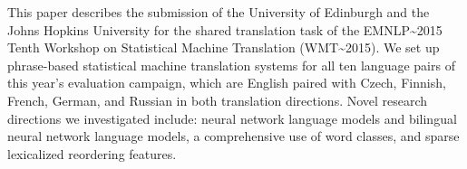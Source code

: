 This paper describes the submission of the University of Edinburgh and the Johns Hopkins University for the shared translation task of the EMNLP{\textasciitilde}2015 Tenth Workshop on Statistical Machine Translation (WMT{\textasciitilde}2015). We set up phrase-based statistical machine translation systems for all ten language pairs of this year's evaluation campaign, which are English paired with Czech, Finnish, French, German, and Russian in both translation directions. Novel research directions we investigated include: neural network language models and bilingual neural network language models, a comprehensive use of word classes, and sparse lexicalized reordering features.
